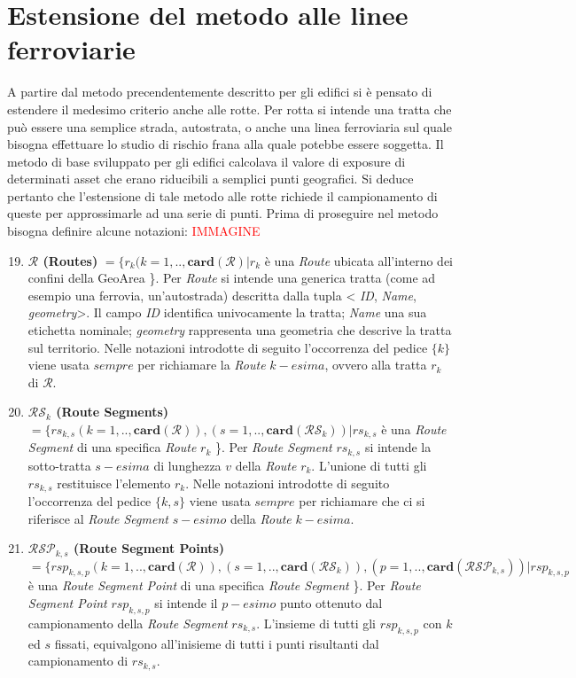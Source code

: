
\chapter{Estensione del metodo alle linee ferroviarie} %
A partire dal metodo precendentemente descritto per gli edifici si è pensato di estendere il medesimo criterio anche alle rotte. Per rotta si intende una tratta che può essere una semplice strada, autostrata, o anche una linea ferroviaria sul quale bisogna effettuare lo studio di rischio frana alla quale potebbe essere soggetta. Il metodo di base sviluppato per gli edifici calcolava il valore di exposure di determinati asset che erano riducibili a semplici punti geografici. Si deduce pertanto che l'estensione di tale metodo alle rotte richiede il campionamento di queste per approssimarle ad una serie di punti.
Prima di proseguire nel metodo bisogna definire alcune notazioni:
\textcolor{red}{IMMAGINE}

\begin{enumerate}
	\setcounter{enumi}{18}
	\item \textbf{$ \mathcal{R} $ (Routes)} $ = \{r_k(k=1,..,\mathbf{card}(\mathcal{R}) | r_k $ è una \textit{Route} ubicata all'interno dei confini della  GeoArea \}. Per \textit{Route} si intende una generica tratta (come ad esempio una ferrovia, un'autostrada) descritta dalla tupla < \textit{ID}, \textit{Name}, \textit{geometry}>. Il campo \textit{ID} identifica univocamente la tratta; \textit{Name} una sua etichetta nominale; \textit{geometry} rappresenta una geometria che descrive la tratta sul territorio. Nelle notazioni introdotte di seguito l'occorrenza del pedice $\{k\}$ viene usata $sempre$ per richiamare la \textit{Route} $k-esima$, ovvero alla tratta $r_k$ di $ \mathcal{R} $.
	
	
	\item \textbf{$ \mathcal{RS}_k $ (Route Segments)} $ = \{rs_{k,s}(k=1,..,\mathbf{card}(\mathcal{R})),(s=1,..,\mathbf{card}(\mathcal{RS}_k))  | rs_{k,s} $ è una \textit{Route Segment} di una specifica \textit{Route} $r_k$ \}. Per \textit{Route Segment} $rs_{k,s}$ si intende la sotto-tratta $s-esima$ di lunghezza $v$ della \textit{Route} $r_k$. L'unione di tutti gli $rs_{k,s}$ restituisce l'elemento $r_k$. Nelle notazioni introdotte di seguito l'occorrenza del pedice $\{k,s\}$ viene usata $sempre$ per richiamare che ci si riferisce al \textit{Route Segment} $s-esimo$ della \textit{Route} $k-esima$.
		
	\item \textbf{$ \mathcal{RSP}_{k,s} $ (Route Segment Points)} $ = \{rsp_{k,s,p}(k=1,..,\mathbf{card}(\mathcal{R})),(s=1,..,\mathbf{card}(\mathcal{RS}_k)),(p=1,..,\mathbf{card}(\mathcal{RSP}_{k,s}))  | rsp_{k,s,p} $ è una \textit{Route Segment Point} di una specifica \textit{Route Segment} \}. Per \textit{Route Segment Point} $rsp_{k,s,p}$ si intende il $p-esimo$ punto ottenuto dal campionamento della \textit{Route Segment} $rs_{k,s}$. L'insieme di tutti gli $rsp_{k,s,p}$ con $k$ ed $s$ fissati, equivalgono all'inisieme di tutti i punti risultanti dal campionamento di $rs_{k,s}$.
	
\end{enumerate}

